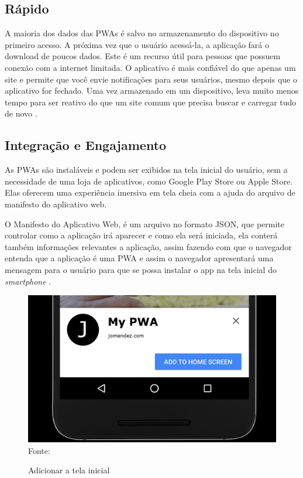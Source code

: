\subsection{Rápido}
A maioria dos dados das \ac{PWA}s é salvo no armazenamento do dispositivo no primeiro acesso. A próxima vez que o usuário acessá-la, a aplicação fará o download de poucos dados. Este é um recurso útil para pessoas que possuem conexão com a internet limitada. O aplicativo é mais confiável do que apenas um site e permite que você envie notificações para seus usuários, mesmo depois que o aplicativo for fechado. Uma vez armazenado em um dispositivo, leva muito menos tempo para ser reativo do que um site comum que precisa buscar e carregar tudo de novo \cite{memoir}.

\subsection{Integração e Engajamento}

As \ac{PWA}s são instaláveis e podem ser exibidos na tela inicial do usuário, sem a necessidade de uma loja de aplicativos, como Google Play Store ou Apple Store. Elas oferecem uma experiência imersiva em tela cheia com a ajuda do arquivo de manifesto do aplicativo web.

O Manifesto do Aplicativo Web, é um arquivo no formato \ac{JSON}, que permite controlar como a aplicação irá aparecer e como ela será iniciada, ela conterá também informações relevantes a aplicação, assim fazendo com que o navegador entenda que a aplicação é uma \ac{PWA} e assim o navegador apresentará uma mensagem para o usuário para que se possa instalar o app na tela inicial do \textit{smartphone} \cite{manifest}.

\begin{figure}[!htpb]
	\centering
	\caption{Adicionar a tela inicial}
	\includegraphics[width=12cm]{images/add-to-home-screen.png}\\
    {\footnotesize Fonte:\cite{pwaHomeScreen}}
 	\label{f_c4_add_home}
\end{figure}

